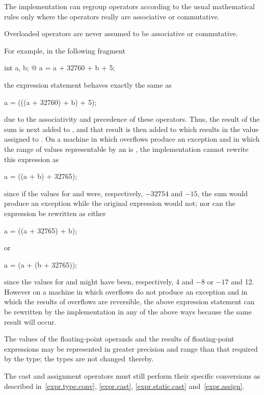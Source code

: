 \pnum
{}%
%
\begin{note}
The implementation can regroup operators according to
the usual mathematical rules only
where the operators really are associative or commutative.
\begin{footnote}
Overloaded
operators are never assumed to be associative or commutative.
\end{footnote}
For example, in the following fragment
\begin{codeblock}
int a, b;
@\commentellip@
a = a + 32760 + b + 5;
\end{codeblock}
the expression statement behaves exactly the same as
\begin{codeblock}
a = (((a + 32760) + b) + 5);
\end{codeblock}
due to the associativity and precedence of these operators. Thus, the
result of the sum  is next added to , and
that result is then added to  which results in the value assigned to
. On a machine in which overflows produce an exception and in
which the range of values representable by an  is
, the implementation cannot rewrite this
expression as
\begin{codeblock}
a = ((a + b) + 32765);
\end{codeblock}
since if the values for  and  were, respectively,
$-32754$ and $-15$, the sum  would produce an exception while
the original expression would not; nor can the expression be rewritten
as either
\begin{codeblock}
a = ((a + 32765) + b);
\end{codeblock}
or
\begin{codeblock}
a = (a + (b + 32765));
\end{codeblock}
since the values for  and  might have been,
respectively, 4 and $-8$ or $-17$ and 12. However on a machine in which
overflows do not produce an exception and in which the results of
overflows are reversible, the above expression statement can be
rewritten by the implementation in any of the above ways because the
same result will occur.
\end{note}

\pnum
The values of the floating-point operands and
the results of floating-point expressions
may be represented in greater precision and range than that
required by the type; the types are not changed\
thereby.
\begin{footnote}
The cast and assignment operators must still perform their specific
conversions as described in~\ref{expr.type.conv}, \ref{expr.cast},
\ref{expr.static.cast} and~\ref{expr.assign}.
\end{footnote}

